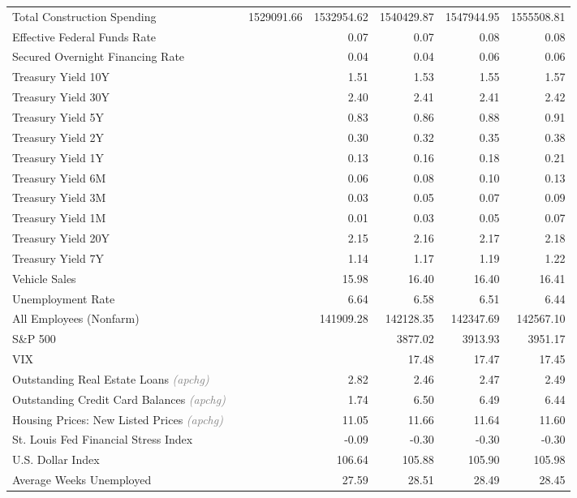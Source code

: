 \documentclass[11pt, letterpaper]{article}\usepackage[]{graphicx}\usepackage[]{color}
\begin{document}
\begin{table}[H]
\begin{tabular}{lrrrrrr}
  Total Construction Spending &  & 1529091.66 & 1532954.62 & 1540429.87 & 1547944.95 & 1555508.81 \\ 
  Effective Federal Funds Rate &  &  & 0.07 & 0.07 & 0.08 & 0.08 \\ 
  Secured Overnight Financing Rate &  &  & 0.04 & 0.04 & 0.06 & 0.06 \\ 
  Treasury Yield 10Y &  &  & 1.51 & 1.53 & 1.55 & 1.57 \\ 
  Treasury Yield 30Y &  &  & 2.40 & 2.41 & 2.41 & 2.42 \\ 
  Treasury Yield 5Y &  &  & 0.83 & 0.86 & 0.88 & 0.91 \\ 
  Treasury Yield 2Y &  &  & 0.30 & 0.32 & 0.35 & 0.38 \\ 
  Treasury Yield 1Y &  &  & 0.13 & 0.16 & 0.18 & 0.21 \\ 
  Treasury Yield 6M &  &  & 0.06 & 0.08 & 0.10 & 0.13 \\ 
  Treasury Yield 3M &  &  & 0.03 & 0.05 & 0.07 & 0.09 \\ 
  Treasury Yield 1M &  &  & 0.01 & 0.03 & 0.05 & 0.07 \\ 
  Treasury Yield 20Y &  &  & 2.15 & 2.16 & 2.17 & 2.18 \\ 
  Treasury Yield 7Y &  &  & 1.14 & 1.17 & 1.19 & 1.22 \\ 
  Vehicle Sales &  &  & 15.98 & 16.40 & 16.40 & 16.41 \\ 
  Unemployment Rate &  &  & 6.64 & 6.58 & 6.51 & 6.44 \\ 
  All Employees (Nonfarm) &  &  & 141909.28 & 142128.35 & 142347.69 & 142567.10 \\ 
  S\&P 500 &  &  &  & 3877.02 & 3913.93 & 3951.17 \\ 
  VIX &  &  &  & 17.48 & 17.47 & 17.45 \\ 
  Outstanding Real Estate Loans \textit{\footnotesize\textcolor{gray}{(apchg)}} &  &  & 2.82 & 2.46 & 2.47 & 2.49 \\ 
  Outstanding Credit Card Balances \textit{\footnotesize\textcolor{gray}{(apchg)}} &  &  & 1.74 & 6.50 & 6.49 & 6.44 \\ 
  Housing Prices: New Listed Prices \textit{\footnotesize\textcolor{gray}{(apchg)}} &  &  & 11.05 & 11.66 & 11.64 & 11.60 \\ 
  St. Louis Fed Financial Stress Index &  &  & -0.09 & -0.30 & -0.30 & -0.30 \\ 
  U.S. Dollar Index &  &  & 106.64 & 105.88 & 105.90 & 105.98 \\ 
  Average Weeks Unemployed &  &  & 27.59 & 28.51 & 28.49 & 28.45 \\ 

\end{tabular}
\end{table}
\end{document}
